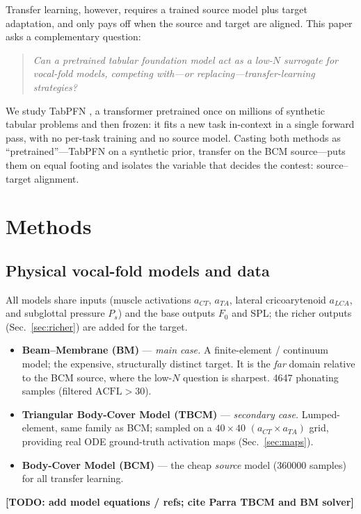\documentclass[11pt]{article}
\newif\ifdraftmode \draftmodetrue
\newcommand{\todo}[1]{\ifdraftmode{\color{red}\textbf{[TODO: #1]}}\fi}
\newcommand{\num}[1]{#1}
\begin{document}
Transfer learning, however, requires a trained source model plus target
adaptation, and only pays off when the source and target are aligned. This
paper asks a complementary question:
\begin{quote}
\emph{Can a pretrained tabular foundation model act as a low-$N$ surrogate for
vocal-fold models, competing with---or replacing---transfer-learning
strategies?}
\end{quote}
We study TabPFN \citep{hollmann2025tabpfn}, a transformer pretrained once on
millions of synthetic tabular problems and then frozen: it fits a new task
in-context in a single forward pass, with no per-task training and no source
model. Casting both methods as ``pretrained''---TabPFN on a synthetic prior,
transfer on the BCM source---puts them on equal footing and isolates the
variable that decides the contest: source--target alignment.

\section{Methods}
\label{sec:methods}

\subsection{Physical vocal-fold models and data}
\label{sec:models}
All models share inputs (muscle activations $a_{CT}$, $a_{TA}$, lateral
cricoarytenoid $a_{LCA}$, and subglottal pressure $P_s$) and the base outputs
$F_0$ and SPL; the richer outputs (Sec.~\ref{sec:richer}) are added for the
target.
\begin{itemize}
  \item \textbf{Beam--Membrane (BM)} --- \emph{main case.} A finite-element /
  continuum model; the expensive, structurally distinct target. It is the
  \emph{far} domain relative to the BCM source, where the low-$N$ question is
  sharpest. \num{4647} phonating samples (filtered $\mathrm{ACFL}>30$).
  \item \textbf{Triangular Body-Cover Model (TBCM)} --- \emph{secondary case.}
  Lumped-element, same family as BCM; sampled on a $40\times40$
  $(a_{CT}\times a_{TA})$ grid, providing real ODE ground-truth activation maps
  (Sec.~\ref{sec:maps}).
  \item \textbf{Body-Cover Model (BCM)} --- the cheap \emph{source} model
  (\num{360000} samples) for all transfer learning.
\end{itemize}
\todo{add model equations / refs; cite Parra TBCM and BM solver}
\end{document}
